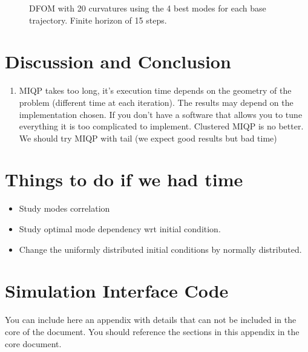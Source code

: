 \documentclass[12,twoside]{TFG-GM}
\theoremstyle{definition}
\theoremstyle{remark}
\begin{document}
\begin{figure}
\begin{minipage}{0.7\textwidth}
        \label{fig:dfom_trajectory_short_horizon}
        \caption{DFOM with 20 curvatures using the 4 best modes for each base trajectory. Finite horizon of 15 steps.}
    \end{minipage}
\end{figure}

\section{Discussion and Conclusion}
\label{sec:conclusion}
\begin{enumerate}
\item{MIQP} takes too long, it's execution time depends on the geometry of the problem (different time at each iteration). The results may depend on the implementation chosen. If you don't have a software that allows you to tune everything it is too complicated to implement. Clustered MIQP is no better. We should try MIQP with tail (we expect good results but bad time)
\end{enumerate}

\section{Things to do if we had time}
\label{sec:todo}
\begin{itemize}
\item Study modes correlation
\item Study optimal mode dependency wrt initial condition.
\item Change the uniformly distributed initial conditions by normally distributed.
\end{itemize}
 
\newpage

{}


\appendix
\vfill\newpage \section{Simulation Interface Code}
\label{app:code}
You can include here an appendix with details that can not be included in the core of the document. You should reference the sections in this appendix in the core document.
\end{document}
